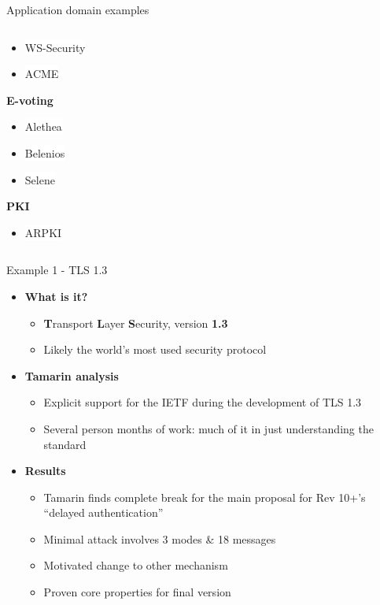\documentclass[11pt,aspectratio=169]{beamer}
\begin{document}
\begin{frame}[fragile]{Application domain examples}
\begin{columns}
\begin{column}{0.3\textwidth}
\begin{itemize}
                \item \colorbox{white}{WS-Security}
                \item \colorbox{white}{ACME}
            \end{itemize}
            \textbf{E-voting}
            \begin{itemize}
                \item \colorbox{white}{Alethea}
                \item \colorbox{white}{Belenios}
                \item \colorbox{white}{Selene}
            \end{itemize}
            \textbf{PKI}
            \begin{itemize}
                \item \colorbox{white}{ARPKI}
            \end{itemize}
        \end{column}
    \end{columns}
\end{frame}

\begin{frame}[fragile]{Example 1 - TLS 1.3}
    \begin{itemize}
        \item \textbf{What is it?}
        \begin{itemize}
            \item \textbf{T}ransport \textbf{L}ayer \textbf{S}ecurity, version 
                  \textbf{1.3}
            \item Likely the world's most used security protocol
        \end{itemize}
        \item \textbf{Tamarin analysis}
        \begin{itemize}
            \item Explicit support for the IETF during the development of
                  TLS 1.3
            \item Several person months of work: much of it in just 
                  understanding the standard
        \end{itemize}
        \item \textbf{Results}
        \begin{itemize}
            \item Tamarin finds complete break for the main proposal for
                  Rev 10+'s ``delayed authentication''
            \item Minimal attack involves 3 modes \& 18 messages
            \item Motivated change to other mechanism
            \item Proven core properties for final version
        \end{itemize}
    \end{itemize}
\end{frame}
\end{document}
